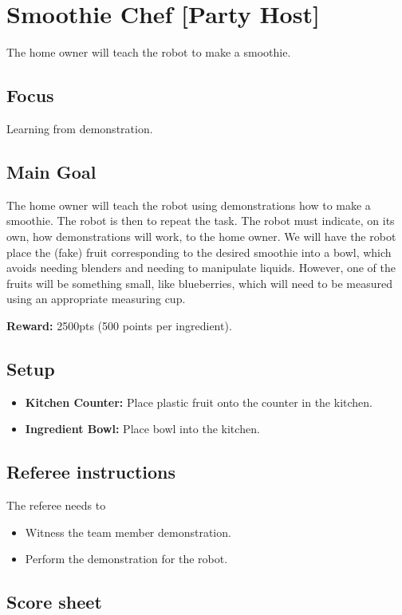 \section{Smoothie Chef [Party Host]}
The home owner will teach the robot to make a smoothie.

\subsection{Focus}
Learning from demonstration.

\subsection{Main Goal}
The home owner will teach the robot using demonstrations how to make a smoothie. The robot is then to repeat the task. The robot must indicate, on its own, how demonstrations will work, to the home owner. We will have the robot place the (fake) fruit corresponding to the desired smoothie into a bowl, which avoids needing blenders and needing to manipulate liquids. However, one of the fruits will be something small, like blueberries, which will need to be measured using an appropriate measuring cup.

\noindent\textbf{Reward:} 2500pts (500 points per ingredient).


\subsection{Setup}
\begin{itemize}[nosep]
	\item \textbf{Kitchen Counter:} Place plastic fruit onto the counter in the kitchen.
	\item \textbf{Ingredient Bowl:} Place bowl into the kitchen.
\end{itemize}

\subsection{Referee instructions}
The referee needs to
\begin{itemize}
	\item Witness the team member demonstration.
	\item Perform the demonstration for the robot.
\end{itemize}


\newpage
\subsection{Score sheet}

